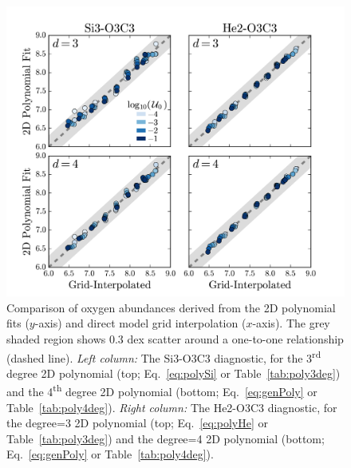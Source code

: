 \documentclass[preprint2]{aastex62}
\begin{document}
\begin{figure}
  \begin{center}
    \includegraphics[width=\linewidth]{figs/A3.png}
    \caption{Comparison of oxygen abundances derived from the 2D polynomial fits ($y$-axis) and direct model grid interpolation ($x$-axis). The grey shaded region shows 0.3 dex scatter around a one-to-one relationship (dashed line). \emph{Left column:} The Si3-O3C3 diagnostic, for the 3\textsuperscript{rd} degree 2D polynomial (top; Eq.~\ref{eq:polySi} or Table~\ref{tab:poly3deg}) and the 4\textsuperscript{th} degree 2D polynomial (bottom; Eq.~\ref{eq:genPoly} or Table~\ref{tab:poly4deg}). \emph{Right column:} The He2-O3C3 diagnostic, for the degree=3 2D polynomial (top; Eq.~\ref{eq:polyHe} or Table~\ref{tab:poly3deg}) and the degree=4 2D polynomial (bottom; Eq.~\ref{eq:genPoly} or Table~\ref{tab:poly4deg}). }
    \label{fig:polyfit}
  \end{center}
\end{figure}
\end{document}
